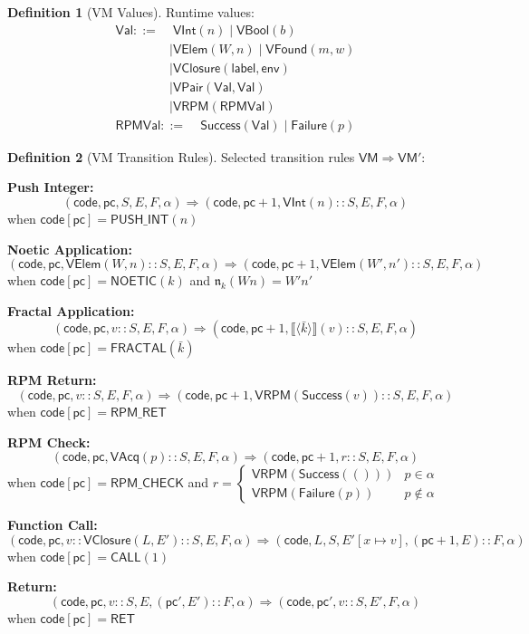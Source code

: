 \documentclass[11pt,twoside,openright]{book}
\theoremstyle{definition}
\newtheorem{definition}{Definition}[chapter]
\theoremstyle{plain}
\theoremstyle{remark}
\newcommand{\sem}[1]{\llbracket #1 \rrbracket}
\newcommand{\VM}{\mathsf{VM}}                %
\begin{document}
\begin{definition}[VM Values]
\label{def:vm-values}
Runtime values:
\begin{align}
\mathsf{Val} ::=&\; \mathsf{VInt}(n) \mid \mathsf{VBool}(b) \\
    &\mid \mathsf{VElem}(W, n) \mid \mathsf{VFound}(m, w) \\
    &\mid \mathsf{VClosure}(\mathsf{label}, \mathsf{env}) \\
    &\mid \mathsf{VPair}(\mathsf{Val}, \mathsf{Val}) \\
    &\mid \mathsf{VRPM}(\mathsf{RPMVal})
\end{align}
\begin{align}
\mathsf{RPMVal} ::=&\; \mathsf{Success}(\mathsf{Val}) \mid \mathsf{Failure}(p)
\end{align}
\end{definition}

\begin{definition}[VM Transition Rules]
\label{def:vm-transitions}
Selected transition rules $\VM \Rightarrow \VM'$:

\textbf{Push Integer:}
\[
(\mathsf{code}, \mathsf{pc}, S, E, F, \alpha) \Rightarrow (\mathsf{code}, \mathsf{pc}+1, \mathsf{VInt}(n) :: S, E, F, \alpha)
\]
when $\mathsf{code}[\mathsf{pc}] = \mathsf{PUSH\_INT}(n)$

\textbf{Noetic Application:}
\[
(\mathsf{code}, \mathsf{pc}, \mathsf{VElem}(W, n) :: S, E, F, \alpha) \Rightarrow (\mathsf{code}, \mathsf{pc}+1, \mathsf{VElem}(W', n') :: S, E, F, \alpha)
\]
when $\mathsf{code}[\mathsf{pc}] = \mathsf{NOETIC}(k)$ and $\mathfrak{n}_k(Wn) = W'n'$

\textbf{Fractal Application:}
\[
(\mathsf{code}, \mathsf{pc}, v :: S, E, F, \alpha) \Rightarrow (\mathsf{code}, \mathsf{pc}+1, \sem{\langle \bar{k} \rangle}(v) :: S, E, F, \alpha)
\]
when $\mathsf{code}[\mathsf{pc}] = \mathsf{FRACTAL}(\bar{k})$

\textbf{RPM Return:}
\[
(\mathsf{code}, \mathsf{pc}, v :: S, E, F, \alpha) \Rightarrow (\mathsf{code}, \mathsf{pc}+1, \mathsf{VRPM}(\mathsf{Success}(v)) :: S, E, F, \alpha)
\]
when $\mathsf{code}[\mathsf{pc}] = \mathsf{RPM\_RET}$

\textbf{RPM Check:}
\[
(\mathsf{code}, \mathsf{pc}, \mathsf{VAcq}(p) :: S, E, F, \alpha) \Rightarrow (\mathsf{code}, \mathsf{pc}+1, r :: S, E, F, \alpha)
\]
when $\mathsf{code}[\mathsf{pc}] = \mathsf{RPM\_CHECK}$ and $r = \begin{cases} \mathsf{VRPM}(\mathsf{Success}(())) & p \in \alpha \\ \mathsf{VRPM}(\mathsf{Failure}(p)) & p \notin \alpha \end{cases}$

\textbf{Function Call:}
\[
(\mathsf{code}, \mathsf{pc}, v :: \mathsf{VClosure}(L, E') :: S, E, F, \alpha) \Rightarrow (\mathsf{code}, L, S, E'[x \mapsto v], (\mathsf{pc}+1, E) :: F, \alpha)
\]
when $\mathsf{code}[\mathsf{pc}] = \mathsf{CALL}(1)$

\textbf{Return:}
\[
(\mathsf{code}, \mathsf{pc}, v :: S, E, (\mathsf{pc}', E') :: F, \alpha) \Rightarrow (\mathsf{code}, \mathsf{pc}', v :: S, E', F, \alpha)
\]
when $\mathsf{code}[\mathsf{pc}] = \mathsf{RET}$
\end{definition}
\end{document}
